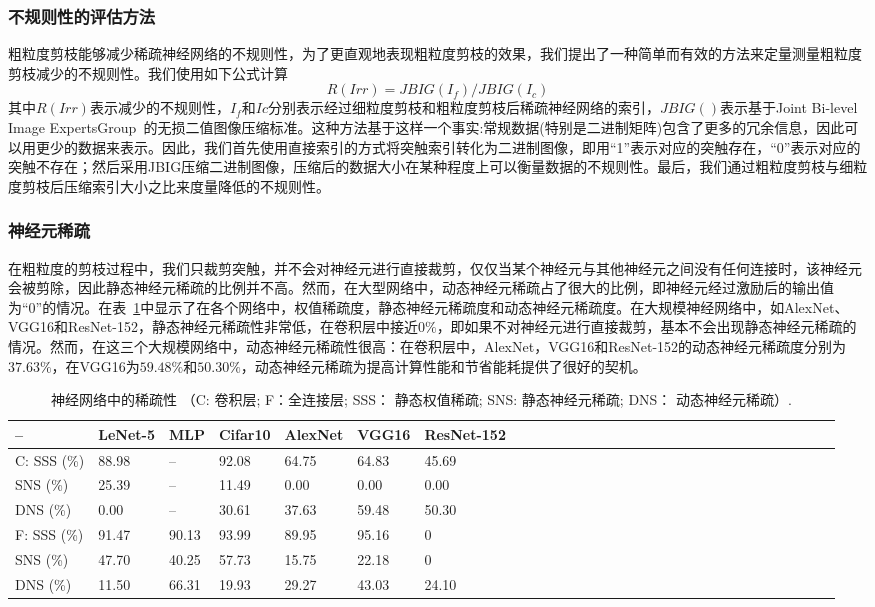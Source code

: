\subsubsection{不规则性的评估方法}
\label{subsubsec:irregularity}

粗粒度剪枝能够减少稀疏神经网络的不规则性，为了更直观地表现粗粒度剪枝的效果，我们提出了一种简单而有效的方法来定量测量粗粒度剪枝减少的不规则性。我们使用如下公式计算
\begin{equation}
R(Irr) = JBIG(I_f)/JBIG(I_c)
\end{equation}
其中$R(Irr)$表示减少的不规则性，$I_{f}$和$I {c}$分别表示经过细粒度剪枝和粗粒度剪枝后稀疏神经网络的索引，$JBIG()$表示基于Joint Bi-level Image ExpertsGroup~\cite{jbig}的无损二值图像压缩标准。这种方法基于这样一个事实:常规数据(特别是二进制矩阵)包含了更多的冗余信息，因此可以用更少的数据来表示。因此，我们首先使用直接索引的方式将突触索引转化为二进制图像，即用“1”表示对应的突触存在，“0”表示对应的突触不存在；然后采用JBIG压缩二进制图像，压缩后的数据大小在某种程度上可以衡量数据的不规则性。最后，我们通过粗粒度剪枝与细粒度剪枝后压缩索引大小之比来度量降低的不规则性。

\subsubsection{神经元稀疏}
在粗粒度的剪枝过程中，我们只裁剪突触，并不会对神经元进行直接裁剪，仅仅当某个神经元与其他神经元之间没有任何连接时，该神经元会被剪除，因此静态神经元稀疏的比例并不高。然而，在大型网络中，动态神经元稀疏占了很大的比例，即神经元经过激励后的输出值为“0”的情况。在表~\ref{tab:sparsities}中显示了在各个网络中，权值稀疏度，静态神经元稀疏度和动态神经元稀疏度。在大规模神经网络中，如AlexNet、VGG16和ResNet-152，静态神经元稀疏性非常低，在卷积层中接近$0\%$，即如果不对神经元进行直接裁剪，基本不会出现静态神经元稀疏的情况。然而，在这三个大规模网络中，动态神经元稀疏性很高：在卷积层中，AlexNet，VGG16和ResNet-152的动态神经元稀疏度分别为$37.63\%$，在VGG16为$59.48\%$和$50.30\%$，动态神经元稀疏为提高计算性能和节省能耗提供了很好的契机。

\begin{table}[h]
\centering
\caption{\footnotesize 神经网络中的稀疏性 （C: 卷积层; F：全连接层; SSS： 静态权值稀疏; SNS: 静态神经元稀疏; DNS： 动态神经元稀疏）.}
\label{tab:sparsities}
\begin{tabular}{@{~}lll@{~}lll@{~}lll@{~}lll@{~}lll@{~}lll@{~}llllllllllll}
\toprule
-- & LeNet-5 & MLP & Cifar10 & AlexNet & VGG16 & ResNet-152 \\
\midrule
C: SSS (\%)& 88.98 	& -- 	& 92.08 & 64.75 & 64.83 & 45.69 \\
   SNS (\%)& 25.39	& -- 	& 11.49 & 0.00 	& 0.00 	& 0.00 \\
   DNS (\%)& 0.00	& -- 	& 30.61 & 37.63	& 59.48 & 50.30 \\
\hline
F: SSS (\%)& 91.47	& 90.13	& 93.99 & 89.95	& 95.16 & 0 \\
   SNS (\%)& 47.70	& 40.25 & 57.73 & 15.75 & 22.18	& 0 \\
   DNS (\%)& 11.50	& 66.31 & 19.93	& 29.27 & 43.03	& 24.10 \\
\bottomrule
\end{tabular}
\end{table}

